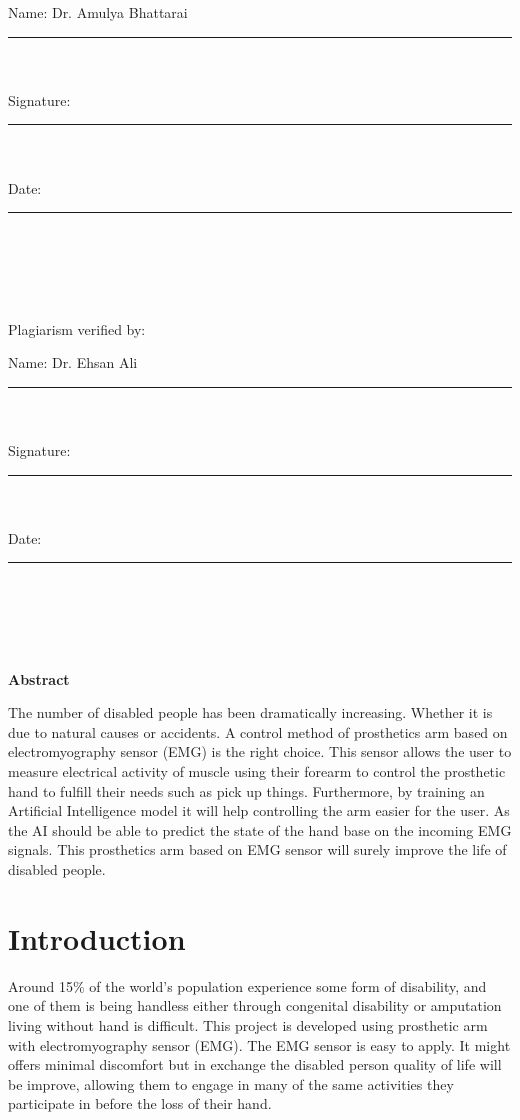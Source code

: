 \documentclass[12pt]{article}
\begin{document}
    \begin{flushright}
        Name: Dr. Amulya Bhattarai\rule{0.80cm}{0mm}   
        \\~\\
        Signature:\rule{3.95cm}{0mm} 
        \\~\\
        Date:\rule{4.7cm}{0.15mm}
        \\~\\~\\~\\
    \end{flushright}
    \begin{flushleft}
        Plagiarism verified by:
    \end{flushleft}
    \begin{flushright}
        Name: Dr. Ehsan Ali\rule{2.18cm}{0mm}   
        \\~\\
        Signature:\rule{4.07cm}{0mm} 
        \\~\\
        Date:\rule{4.8cm}{0.15mm}
        \\~\\~\\~\\
    \end{flushright}
    \newpage
    \begin{flushleft}
        \begin{center}
            \textbf{Abstract}
        \end{center}
        The number of disabled people has been dramatically increasing. Whether it is due to natural causes or accidents.
        A control method of prosthetics arm based on electromyography sensor (EMG) is the right choice.
        This sensor allows the user to measure electrical activity of muscle using their 
        forearm to control the prosthetic hand to fulfill their needs such as pick up things.
        Furthermore, by training an Artificial Intelligence model it will help controlling the arm easier for the user. As the AI should be able to
        predict the state of the hand base on the incoming EMG signals.
        This prosthetics arm based on EMG sensor will surely improve the life of disabled people.
    \end{flushleft}
    \newpage
    \clearpage
    \tableofcontents
    \break
    \section{Introduction}
    \begin{flushleft}
    Around 15\% of the world’s population experience some form of disability, and one of them is being handless either through congenital disability or amputation living without hand is difficult. 
    This project is developed using prosthetic arm with electromyography sensor (EMG). 
    The EMG sensor is easy to apply. It might offers minimal discomfort but in exchange the disabled person quality of life will be improve,
    allowing them to engage in many of the same activities they participate in before the loss of their hand.
    \end{flushleft}
\end{document}
